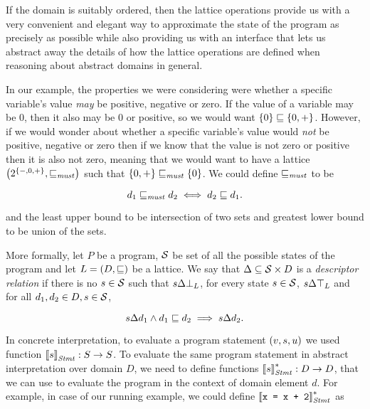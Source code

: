 \documentclass[..thesis.tex]{subfiles}
\begin{document}
If the domain is suitably ordered, then the lattice operations provide us with a very convenient and elegant way to approximate the state of the program
as precisely as possible while also providing us with an interface that lets us abstract away the details of how the lattice operations are
defined when reasoning about abstract domains in general. 

In our example, the properties we were considering were whether a specific variable's value \textit{may} be positive, negative or zero.
If the value of a variable may be $0$, then it also may be $0$ or positive, so we would want $\left\lbrace 0 \right\rbrace \sqsubseteq \left\lbrace 0, + \right\rbrace$.
However, if we would wonder about whether a specific variable's value would \textit{not} be positive, negative or zero then if we know that the value is not zero or positive
then it is also not zero, meaning that we would want to have a lattice $\left( 2^{\left\lbrace -,0,+ \right\rbrace}, \sqsubseteq_{\mathit{must}} \right)$ such that
$\left\lbrace 0 , + \right\rbrace \sqsubseteq_{\mathit{must}} \left\lbrace 0 \right\rbrace$. We could define $\sqsubseteq_{\mathit{must}}$ to be

\begin{equation*}
d_1 \sqsubseteq_{\mathit{must}} d_2 \iff d_2 \sqsubseteq d_1 \text{.} 
\end{equation*} 

and the least upper bound to be intersection of two sets and greatest lower bound to be union of the sets.




More formally, let $P$ be a program, $\mathcal{S}$ be set of all the possible states of the program and let $L = \left( D, \sqsubseteq \right)$ be a lattice.
We say that $\Delta \subseteq \mathcal{S} \times D$ is a \textit{descriptor relation} if there is no $s \in \mathcal{S}$ such that $s \Delta \bot_L$,
for every state $s \in \mathcal{S}$, $s \Delta \top_L$ and for all $d_1,d_2 \in D, s \in \mathcal{S}$,

\begin{equation*}
s \Delta d_1 \land d_1 \sqsubseteq d_2 \implies s \Delta d_2 \text{.}
\end{equation*}

In concrete interpretation, to evaluate a program statement $\left( v, s, u \right)$ we used function $\left\llbracket s \right\rrbracket_{\mathit{Stmt}} : S \to S$.
To evaluate the same program statement in abstract interpretation over domain $D$, we need to define functions $\left\llbracket s \right\rrbracket_{\mathit{Stmt}}^{*} : D \to D$,
that we can use to evaluate the program in the context of domain element $d$. For example, in case of our running example,
we could define $\left\llbracket \text{\texttt{x =  x + 2}} \right\rrbracket_{\mathit{Stmt}}^{*}$ as
\end{document}
